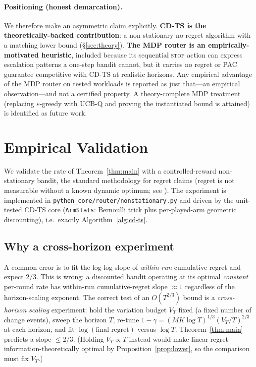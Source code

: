 \documentclass[11pt]{article}
\theoremstyle{definition}
\begin{document}
\paragraph{Positioning (honest demarcation).}
We therefore make an asymmetric claim explicitly. \textbf{CD-TS is the
theoretically-backed contribution}: a non-stationary no-regret algorithm
with a matching lower bound (\S\ref{sec:theory}). \textbf{The MDP router is
an empirically-motivated heuristic}, included because its sequential
\textsc{stop} action can express escalation patterns a one-step bandit
cannot, but it carries no regret or PAC guarantee competitive with CD-TS at
realistic horizons. Any empirical advantage of the MDP router on tested
workloads is reported as just that---an empirical observation---and not a
certified property. A theory-complete MDP treatment (replacing
$\varepsilon$-greedy with \textsc{UCB-Q} and proving the instantiated
bound is attained) is identified as future work.

\section{Empirical Validation}
\label{sec:experiments}

We validate the rate of Theorem~\ref{thm:main} with a controlled-reward
non-stationary bandit, the standard methodology for regret claims (regret
is not measurable without a known dynamic optimum; see
\cite{garivier2008upper,besbes2014stochastic}). The experiment is
implemented in \texttt{python\_core/router/nonstationary.py} and driven by
the unit-tested CD-TS core (\texttt{ArmStats}: Bernoulli trick plus
per-played-arm geometric discounting), i.e.\ exactly
Algorithm~\ref{alg:cd-ts}.

\subsection{Why a cross-horizon experiment}

A common error is to fit the log-log slope of \emph{within-run} cumulative
regret and expect $2/3$. This is wrong: a discounted bandit operating at
its optimal \emph{constant} per-round rate has within-run cumulative-regret
slope $\approx 1$ regardless of the horizon-scaling exponent. The correct
test of an $O(T^{2/3})$ bound is a \emph{cross-horizon scaling}
experiment: hold the variation budget $V_T$ fixed (a fixed number of
change events), sweep the horizon $T$, re-tune
$1{-}\gamma = (MK \log T)^{1/3}(V_T/T)^{2/3}$ at each horizon, and fit
$\log(\text{final regret})$ versus $\log T$. Theorem~\ref{thm:main}
predicts a slope $\leq 2/3$. (Holding $V_T \propto T$ instead would make
linear regret information-theoretically optimal by
Proposition~\ref{prop:lower}, so the comparison must fix $V_T$.)
\end{document}
